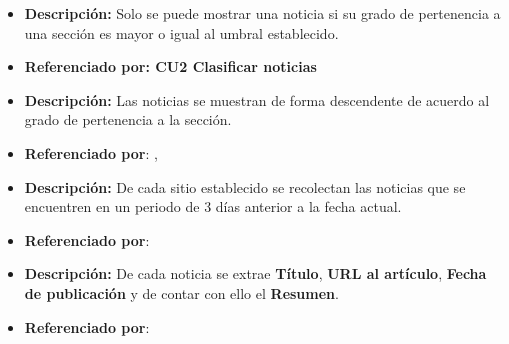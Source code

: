 \begin{itemize}
  \item \textbf{Descripción:} Solo se puede mostrar una noticia si su grado de pertenencia a una sección es mayor o igual al umbral establecido.
  \item \textbf{Referenciado por: CU2 Clasificar noticias}  \\
\end{itemize}


\begin{itemize}
  \item \textbf{Descripción:} Las noticias se muestran de forma descendente de acuerdo al grado de pertenencia
    a la sección.
  \item \textbf{Referenciado por}: , \\
\end{itemize}


\begin{itemize}
  \item \textbf{Descripción:} De cada sitio establecido se recolectan las noticias que se encuentren en un periodo de 3 días anterior a la fecha actual.
  \item \textbf{Referenciado por}:  \\
\end{itemize}


\begin{itemize}
  \item \textbf{Descripción:} De cada noticia se extrae \textbf{Título}, \textbf{URL al artículo}, \textbf{Fecha de publicación} y de contar con ello el \textbf{Resumen}.

  \item \textbf{Referenciado por}:  \\
\end{itemize}


